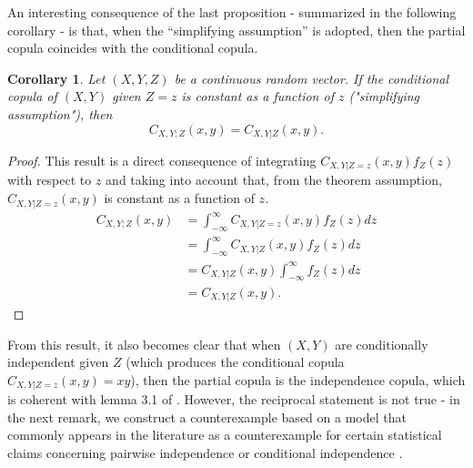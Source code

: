 \documentclass[
]{article}
\newtheorem{corollary}{Corollary}
\begin{document}
An interesting consequence of the last proposition - summarized in the
following corollary - is that, when the ``simplifying assumption''
\citep[commonly used in Vine copula modeling, see][]{czado2022} is
adopted, then the partial copula coincides with the conditional copula.

\begin{corollary}\label{cor:partial-conditional-copula}
Let $(X, Y, Z)$ be a continuous random vector. If the conditional copula of $(X, Y)$ given $Z = z$ is constant as a function of $z$ ("simplifying assumption"), then
$$C_{X,Y;Z}(x, y) = C_{X,Y|Z}(x, y).$$
\end{corollary}

\begin{proof}
This result is a direct consequence of integrating $C_{X,Y|Z=z}(x, y) f_Z(z)$ with respect to $z$ and taking into account that, from the theorem assumption, $C_{X,Y|Z=z}(x, y)$ is constant as a function of $z$.
\begin{align*}
C_{X,Y;Z}(x, y) &= \int_{-\infty}^{\infty} C_{X,Y|Z=z}(x, y) f_Z(z) dz \\
&= \int_{-\infty}^{\infty} C_{X,Y|Z}(x, y) f_Z(z) dz \\
&= C_{X,Y|Z}(x, y) \int_{-\infty}^{\infty} f_Z(z) dz \\
&= C_{X,Y|Z}(x, y).
\end{align*}
\end{proof}

From this result, it also becomes clear that when \((X, Y)\) are
conditionally independent given \(Z\) (which produces the conditional
copula \(C_{X,Y|Z=z}(x, y) = xy\)), then the partial copula is the
independence copula, which is coherent with lemma 3.1 of
\citet{patra2016}. However, the reciprocal statement is not true - in
the next remark, we construct a counterexample based on a model that
commonly appears in the literature as a counterexample for certain
statistical claims concerning pairwise independence or conditional
independence \citep[e.g.,][]{nelsen2012, gonzalezlopez2024}.
\end{document}
